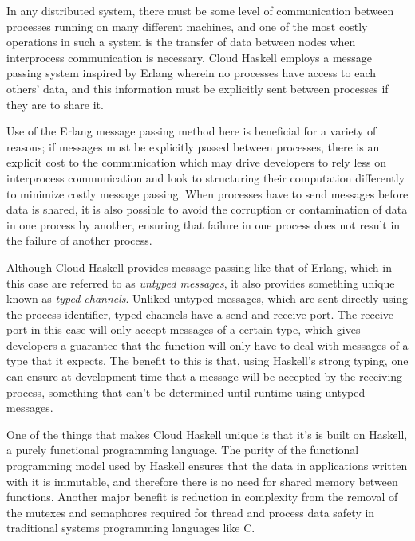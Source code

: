 \documentclass[10pt,a4paper,twocolumn]{article}
\begin{document}
In any distributed system, there must be some level of communication between
processes running on many different machines, and one of the most costly
operations in such a system is the transfer of data between nodes when
interprocess communication is necessary. Cloud Haskell employs a message passing
system inspired by Erlang wherein no processes have access to each others' data,
and this information must be explicitly sent between processes if they are to
share it.

Use of the Erlang message passing method here is beneficial for a variety of
reasons; if messages must be explicitly passed between processes, there is an
explicit cost to the communication which may drive developers to rely less on
interprocess communication and look to structuring their computation differently
to minimize costly message passing. When processes have to send messages before
data is shared, it is also possible to avoid the corruption or contamination of
data in one process by another, ensuring that failure in one process does not
result in the failure of another process.

Although Cloud Haskell provides message passing like that of Erlang, which in
this case are referred to as \emph{untyped messages}, it also provides something
unique known as \emph{typed channels}. Unliked untyped messages, which are sent
directly using the process identifier, typed channels have a send and receive
port. The receive port in this case will only accept messages of a certain type,
which gives developers a guarantee that the function will only have to deal with
messages of a type that it expects. The benefit to this is that, using Haskell's
strong typing, one can ensure at development time that a message will be
accepted by the receiving process, something that can't be determined until
runtime using untyped messages.

One of the things that makes Cloud Haskell unique is that it's is built on
Haskell, a purely functional programming language. The purity of the functional
programming model used by Haskell ensures that the data in applications written
with it is immutable, and therefore there is no need for shared memory between
functions. Another major benefit is reduction in complexity from the removal of
the mutexes and semaphores required for thread and process data safety in
traditional systems programming languages like C.
\end{document}
